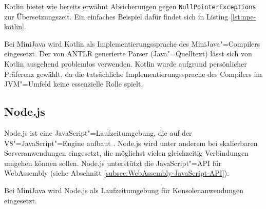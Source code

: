 



Kotlin bietet wie bereits erwähnt Absicherungen gegen \lstinline{NullPointerExceptions} zur Übersetzungszeit. Ein einfaches Beispiel dafür findet sich in Listing \ref{lst:npe-kotlin}.



Bei MiniJava wird Kotlin als Implementierungssprache des MiniJava"=Compilers eingesetzt. Der von ANTLR generierte Parser (Java"=Quelltext) lässt sich von Kotlin ausgehend problemlos verwenden. Kotlin wurde aufgrund persönlicher Präferenz gewählt, da die tatsächliche Implementierungssprache des Compilers im JVM"=Umfeld keine essenzielle Rolle spielt.

\pagebreak
\subsection{Node.js}
Node.js ist eine JavaScript"=Laufzeitumgebung, die auf der V8"=JavaScript"=Engine aufbaut \cite{NodeJSDocumentation}. Node.js wird unter anderem bei skalierbaren Serveranwendungen eingesetzt, die möglichst vielen gleichzeitig Verbindungen umgehen können sollen. Node.js unterstützt die JavaScript"=API für WebAssembly (siehe Abschnitt \ref{subsec:WebAssembly-JavaScript-API}).

Bei MiniJava wird Node.js als Laufzeitumgebung für Konsolenanwendungen eingesetzt.

